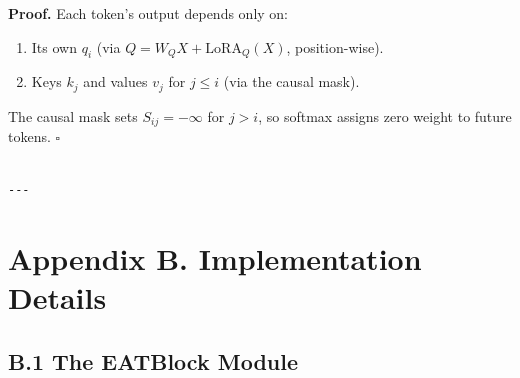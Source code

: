 \textbf{Proof.} Each token's output depends only on:

\begin{enumerate}
\item Its own $q_i$ (via $Q = W_Q X + \text{LoRA}_Q(X)$, position-wise).
\item Keys $k_j$ and values $v_j$ for $j \leq i$ (via the causal mask).

\end{enumerate}
The causal mask sets $S_{ij} = -\infty$ for $j > i$, so softmax assigns zero 
weight to future tokens. $\square$
\begin{lstlisting}

---
\end{lstlisting}


\section{Appendix B. Implementation Details}

\subsection{B.1 The EATBlock Module}

